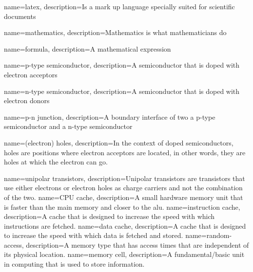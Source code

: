 {
        name=latex,
        description={Is a mark up language specially suited for 
scientific documents}
}

{
        name=mathematics,
        description={Mathematics is what mathematicians do}
}

{
        name=formula,
        description={A mathematical expression}
}

{
        name=p-type semiconductor,
        description={A semiconductor that is doped with electron acceptors}
}

{
        name=n-type semiconductor,
        description={A semiconductor that is doped with electron donors}
}

{
        name=p-n junction,
        description={A boundary interface of two  a p-type semiconductor and a n-type semiconductor}
}

{
        name=(electron) holes,
        description={In the context of doped semiconductors, holes are positions where electron acceptors are located, in other words, they are holes at which the electron can go.}
}

{
        name=unipolar transistors,
        description={Unipolar transistors are transistors that use either electrons or electron holes as charge carriers and not the combination of the two.}
}
{
        name=CPU cache,
        description={A small hardware memory unit that is faster than the main memory and closer to the \acrlong{alu}.}
}
{
        name=instruction cache,
        description={A cache that is designed to increase the speed with which instructions are fetched.}
}
{
        name=data cache,
        description={A cache that is designed to increase the speed with which data is fetched and stored.}
}
{
        name=random-access,
        description={A memory type that has access times that are independent of its physical location.}
}
{
        name=memory cell,
        description={A fundamental/basic unit in computing that is used to store information.}
}


